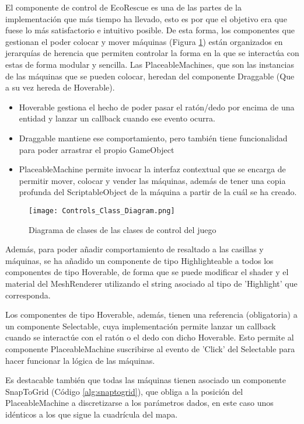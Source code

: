 El componente de control de EcoRescue es una de las partes de la implementación que más tiempo ha llevado, esto es por que el objetivo era que fuese lo más satisfactorio e intuitivo posible. De esta forma, los componentes que gestionan el poder colocar y mover máquinas (Figura \ref{fig:controlUML}) están organizados en jerarquías de herencia que permiten controlar la forma en la que se interactúa con estas de forma modular y sencilla. Las PlaceableMachines, que son las instancias de las máquinas que se pueden colocar, heredan del componente Draggable (Que a su vez hereda de Hoverable). 
\begin{itemize}
    \item Hoverable gestiona el hecho de poder pasar el ratón/dedo por encima de una entidad y lanzar un callback cuando ese evento ocurra. 
    \item Draggable mantiene ese comportamiento, pero también tiene funcionalidad para poder arrastrar el propio GameObject
    \item PlaceableMachine permite invocar la interfaz contextual que se encarga de permitir mover, colocar y vender las máquinas, además de tener una copia profunda del ScriptableObject de la máquina a partir de la cuál se ha creado. 
\end{itemize}

\begin{figure}[H]
    \centering
      \texttt{[image: Controls\_Class\_Diagram.png]}
    \caption{Diagrama de clases de las clases de control del juego}
    \label{fig:controlUML}
\end{figure}

Además, para poder añadir comportamiento de resaltado a las casillas y máquinas, se ha añadido un componente de tipo Highlighteable a todos los componentes de tipo Hoverable, de forma que se puede modificar el shader y el material del MeshRenderer utilizando el string asociado al tipo de 'Highlight' que corresponda.

Los componentes de tipo Hoverable, además, tienen una referencia (obligatoria) a un componente Selectable, cuya implementación permite lanzar un callback cuando se interactúe con el ratón o el dedo con dicho Hoverable. Esto permite al componente PlaceableMachine suscribirse al evento de 'Click' del Selectable para hacer funcionar la lógica de las máquinas.

Es destacable también que todas las máquinas tienen asociado un componente SnapToGrid (Código \ref{alg:snaptogrid}), que obliga a la posición del PlaceableMachine a discretizarse a los parámetros dados, en este caso unos idénticos a los que sigue la cuadrícula del mapa.

